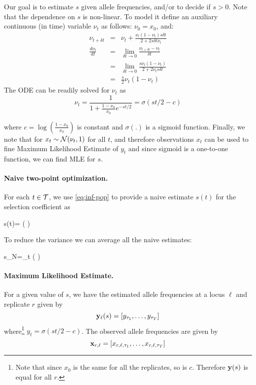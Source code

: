 Our goal is to estimate $s$ given allele frequencies, and/or to decide
if $s>0$. Note that the dependence on $s$ is non-linear. To model it
define an auxiliary continuous (in time) variable $\nu_t$ as follows:
$\nu_0=x_0$, and:
\begin{eqnarray}
  \nu_{t+\delta t} &=& \nu_t+\frac{\nu_t(1-\nu_t)s\delta t}{2+2s\delta t \nu_t}\\
  \frac{d\nu_t}{dt} &=&\lim_{\delta t\rightarrow 0}\frac{\nu_{t+\delta t} -\nu_t}{\delta t}\\
   &=&\lim_{\delta t\rightarrow 0}\frac{s\nu_t(1-\nu_t)}{2+2\nu_ts\delta t}\\
   &=& \frac{s}{2}\nu_t(1-\nu_t) 
  \label{eq:ode}
\end{eqnarray}
The ODE can be readily solved for $\nu_t$ as
\begin{equation}
  \nu_t =\frac{1}{1+\frac{1-x_0}{x_0}e^{-st/2}} = \sigma(st/2-c) 
  \label{eq:inf-pop}
\end{equation}

where $c=\log\left(\frac{1-x_0}{x_0}\right)$ is constant
\cite{Stephan2006} and $\sigma(.)$ is a sigmoid
function. Finally, we note that for $x_t\sim{\cal N}(\nu_t,1)$ for all $t$,
and therefore observations $x_t$ can be used to fine Maximum
Likelihood Estimate of $y_t$ and since sigmoid is a one-to-one
function, we can find MLE for $s$.

\paragraph{Naive two-point optimization.} 
For each $t\in {\cal T}$, we use \eqref{eq:inf-pop} to provide a naive
estimate $s(t)$ for the selection coefficient as

\beq 
s(t)= \log \left(  \right) 
\eeq

To reduce the variance we can average all the naive estimates: 

\beq
s_{N}=\sum_{t\in \Tc} \log \left(  \right) 
\label{eq:naive}
\eeq


\paragraph{Maximum Likelihood Estimate.}
For a given value of $s$, we have the estimated allele frequencies at
a locus $\ell$  and replicate $r$ given by
\[
{{\mathbf y}_{\ell}(s)} = [y_{\tau_1},\ldots,y_{\tau_T}]
\]
where\footnote{Note that since $x_0$ is the same for all the replicates, so is $c$. Therefore ${\mathbf y}(s)$ is equal for all $r$. } $y_{t}=\sigma(st/2-c)$. The observed allele frequencies are
given by
\[
{{\mathbf x}_{r,\ell}} = [x_{r,\ell,\tau_1},\ldots,x_{r,\ell,\tau_T}]
\]

